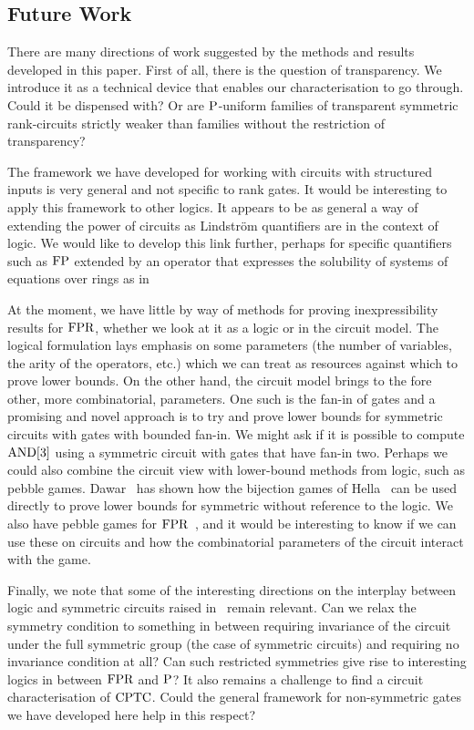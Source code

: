 \documentclass[a4paper,UKenglish]{lipics-v2018}
\begin{document}
\subsection*{Future Work}
There are many directions of work suggested by the methods and results developed
in this paper. First of all, there is the question of transparency. We introduce
it as a technical device that enables our characterisation to go through. Could
it be dispensed with? Or are $\mathrm{P}$-uniform families of transparent symmetric
rank-circuits strictly weaker than families without the restriction of
transparency? 

The framework we have developed for working with circuits with structured inputs
is very general and not specific to rank gates. It
would be interesting to apply this framework to other logics. It appears to be
as general a way of extending the power of circuits as Lindstr\"om quantifiers
are in the context of logic. We would like to develop this link further, perhaps
for specific quantifiers such as $\text{\upshape FP}$ extended by an operator that expresses
the solubility of systems of equations over rings as in~\cite{DGHKP}

At the moment, we have little by way of methods for proving inexpressibility
results for $\text{\upshape FPR}$, whether we look at it as a logic or in the circuit model.
The logical formulation lays emphasis on some parameters (the number of
variables, the arity of the operators, etc.) which we can treat as resources
against which to prove lower bounds. On the other hand, the circuit model brings
to the fore other, more combinatorial, parameters. One such is the fan-in of
gates and a promising and novel approach is to try and prove lower bounds for
symmetric circuits with gates with bounded fan-in. We might ask if it is
possible to compute $\text{\upshape AND}[3]$ using a symmetric circuit with gates that have
fan-in two. Perhaps we could also combine the circuit view with lower-bound
methods from logic, such as pebble games. Dawar~\cite{Dawar2016} has shown how
the bijection games of Hella~\cite{Hella19961} can be used directly to prove
lower bounds for symmetric without reference to the logic. We also have pebble
games for $\text{\upshape FPR}$~\cite{DawarH2012}, and it would be interesting to know if we
can use these on circuits and how the combinatorial parameters of the circuit
interact with the game.

Finally, we note that some of the interesting directions on the interplay
between logic and symmetric circuits raised in~\cite{AndersonD17} remain
relevant. Can we relax the symmetry condition to something in between requiring
invariance of the circuit under the full symmetric group (the case of symmetric
circuits) and requiring no invariance condition at all? Can such restricted
symmetries give rise to interesting logics in between $\text{\upshape FPR}$ and $\mathrm{P}$? It also
remains a challenge to find a circuit characterisation of $\text{\upshape CPTC}$. Could the
general framework for non-symmetric gates we have developed here help in this
respect?



% 
\end{document}
